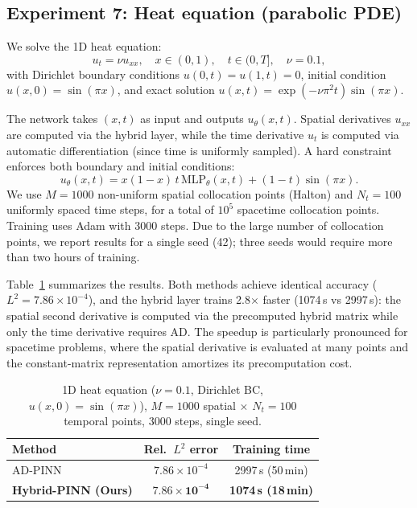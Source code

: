\documentclass[sn-mathphys,Numbered]{sn-jnl}
\theoremstyle{thmstyleone}
\theoremstyle{thmstyletwo}
\theoremstyle{thmstylethree}
\begin{document}
\subsection{Experiment 7: Heat equation (parabolic PDE)}\label{subsec:exp7}
We solve the 1D heat equation:
\begin{equation}
    u_t = \nu u_{xx}, \quad x \in (0,1), \quad t \in (0, T], \quad \nu = 0.1,
\end{equation}
with Dirichlet boundary conditions $u(0,t)=u(1,t)=0$, initial condition $u(x,0)=\sin(\pi x)$, and exact solution $u(x,t) = \exp(-\nu\pi^2 t)\sin(\pi x)$.

The network takes $(x,t)$ as input and outputs $u_\theta(x,t)$. Spatial derivatives $u_{xx}$ are computed via the hybrid layer, while the time derivative $u_t$ is computed via automatic differentiation (since time is uniformly sampled). A hard constraint enforces both boundary and initial conditions:
\begin{equation}
    u_\theta(x,t) = x(1-x)\,t\,\mathrm{MLP}_\theta(x,t) + (1-t)\sin(\pi x).
\end{equation}
We use $M=1000$ non-uniform spatial collocation points (Halton) and $N_t=100$ uniformly spaced time steps, for a total of $10^5$ spacetime collocation points. Training uses Adam with 3000 steps. Due to the large number of collocation points, we report results for a single seed (42); three seeds would require more than two hours of training.

Table~\ref{tab:heat} summarizes the results. Both methods achieve identical accuracy ($L^2 = 7.86\times10^{-4}$), and the hybrid layer trains 2.8$\times$ faster (1074\,s vs 2997\,s): the spatial second derivative is computed via the precomputed hybrid matrix while only the time derivative requires AD. The speedup is particularly pronounced for spacetime problems, where the spatial derivative is evaluated at many points and the constant-matrix representation amortizes its precomputation cost.

\begin{table}[t]
\centering
\caption{1D heat equation ($\nu=0.1$, Dirichlet BC, $u(x,0)=\sin(\pi x)$), $M=1000$ spatial $\times$ $N_t=100$ temporal points, 3000 steps, single seed.}
\label{tab:heat}
\begin{tabular}{lcc}
\toprule
Method & Rel.\ $L^2$ error & Training time \\
\midrule
AD-PINN & $7.86\times10^{-4}$ & 2997\,s (50\,min) \\
\textbf{Hybrid-PINN (Ours)} & $\mathbf{7.86\times10^{-4}}$ & \textbf{1074\,s (18\,min)} \\
\bottomrule
\end{tabular}
\end{table}
\end{document}
